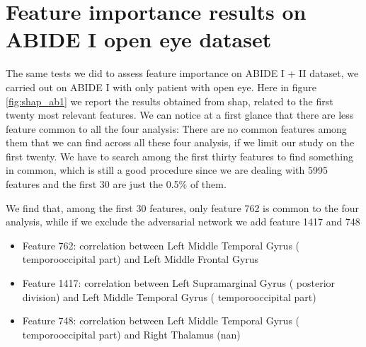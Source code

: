\documentclass[11pt]{report}
\begin{document}
\section{Feature importance results on ABIDE I open eye dataset}

The same tests we did to assess feature importance on ABIDE I + II dataset, we carried out on ABIDE I with only patient with open eye.
Here in figure \ref{fig:shap_ab1} we report the results obtained from shap, related to the first twenty most relevant features.
We can notice at a first glance that there are less feature common to all the four analysis:
There are no common features among them that we can find across all these four analysis, if we limit our study on the first twenty.
We have to search among the first thirty features to find something in common, which is still a good procedure since we are dealing with 5995 features and the first 30 are just the 0.5\% of them.

We find that, among the first 30 features, only feature  762 is common to the four analysis, while if we exclude the adversarial network we add feature 1417 and 748




\begin{itemize}
\item Feature 762: correlation between Left Middle Temporal Gyrus ( temporooccipital part) and Left Middle Frontal Gyrus
\item Feature 1417: correlation between Left Supramarginal Gyrus ( posterior division) and Left Middle Temporal Gyrus ( temporooccipital part)
\item Feature 748: correlation between Left Middle Temporal Gyrus ( temporooccipital part) and Right Thalamus (nan)
\end{itemize}
\end{document}
